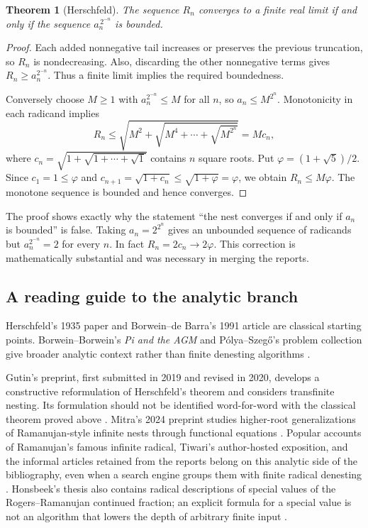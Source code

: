 \documentclass[11pt,oneside]{article}
\numberwithin{equation}{section}
\newtheorem{theorem}{Theorem}[section]
\theoremstyle{definition}
\theoremstyle{remark}
\begin{document}
\begin{theorem}[Herschfeld]\label{thm:herschfeld}
The sequence $R_n$ converges to a finite real limit if and only if the sequence $a_n^{\,2^{-n}}$ is bounded.
\end{theorem}

\begin{proof}
Each added nonnegative tail increases or preserves the previous truncation, so $R_n$ is nondecreasing. Also, discarding the other nonnegative terms gives $R_n\ge a_n^{2^{-n}}$. Thus a finite limit implies the required boundedness.

Conversely choose $M\ge1$ with $a_n^{2^{-n}}\le M$ for all $n$, so $a_n\le M^{2^n}$. Monotonicity in each radicand implies
\[
R_n\le\sqrt{M^2+\sqrt{M^4+\cdots+\sqrt{M^{2^n}}}}
=M c_n,
\]
where $c_n=\sqrt{1+\sqrt{1+\cdots+\sqrt1}}$ contains $n$ square roots. Put $\varphi=(1+\sqrt5)/2$. Since $c_1=1\le\varphi$ and $c_{n+1}=\sqrt{1+c_n}\le\sqrt{1+\varphi}=\varphi$, we obtain $R_n\le M\varphi$. The monotone sequence is bounded and hence converges.
\end{proof}

The proof shows exactly why the statement ``the nest converges if and only if $a_n$ is bounded'' is false. Taking $a_n=2^{2^n}$ gives an unbounded sequence of radicands but $a_n^{2^{-n}}=2$ for every $n$. In fact $R_n=2c_n\to2\varphi$. This correction is mathematically substantial and was necessary in merging the reports.

\subsection{A reading guide to the analytic branch}
Herschfeld's 1935 paper and Borwein--de Barra's 1991 article are classical starting points. Borwein--Borwein's \emph{Pi and the AGM} and P\'olya--Szeg\H{o}'s problem collection give broader analytic context rather than finite denesting algorithms \cite{herschfeld,borweinradicals,piagm,polya}.

Gutin's preprint, first submitted in 2019 and revised in 2020, develops a constructive reformulation of Herschfeld's theorem and considers transfinite nesting. Its formulation should not be identified word-for-word with the classical theorem proved above \cite{gutin}. Mitra's 2024 preprint studies higher-root generalizations of Ramanujan-style infinite nests through functional equations \cite{mitra}. Popular accounts of Ramanujan's famous infinite radical, Tiwari's author-hosted exposition, and the informal articles retained from the reports belong on this analytic side of the bibliography, even when a search engine groups them with finite radical denesting \cite{tiwari,infiniteblogs}. Honsbeek's thesis also contains radical descriptions of special values of the Rogers--Ramanujan continued fraction; an explicit formula for a special value is not an algorithm that lowers the depth of arbitrary finite input \cite{honsbeek}.
\end{document}
